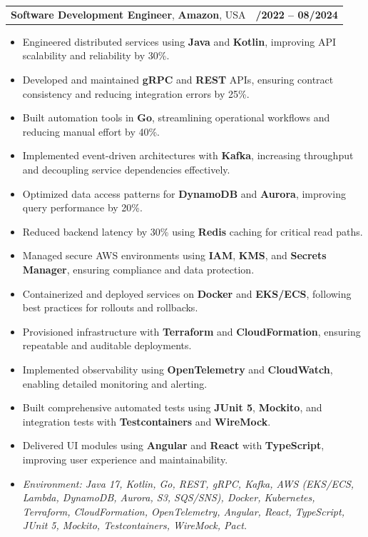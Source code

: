 \documentclass[letterpaper,11pt]{article}
\makeatletter
\newcommand{\resumeItem}[1]{
  \item\footnotesize{
    {#1 \vspace{-2pt}}
  }
}
\newcommand{\resumeSubheading}[4]{
  \vspace{-2pt}\item
    \begin{tabular*}{1.0\textwidth}[t]{l@{\extracolsep{\fill}}r}
      \textbf{\fontsize{10pt}{14pt}\selectfont #3}, \textbf{\fontsize{10pt}{14pt}\selectfont #1}, \fontsize{10pt}{14pt}\selectfont #4 & \textbf{\fontsize{10pt}{14pt}\selectfont #2} \\
    \end{tabular*}\vspace{-7pt}
}
\newcommand{\resumeItemListStart}{\begin{itemize}[leftmargin=*]}
\newcommand{\resumeItemListEnd}{\end{itemize}\vspace{-5pt}}
\makeatother
\begin{document}
\resumeSubheading
{Amazon}{10/2022 -- 08/2024}
{Software Development Engineer}{USA}
\resumeItemListStart
  \resumeItem{Engineered distributed services using \textbf{Java} and \textbf{Kotlin}, improving API scalability and reliability by 30\%.}
  \resumeItem{Developed and maintained \textbf{gRPC} and \textbf{REST} APIs, ensuring contract consistency and reducing integration errors by 25\%.}
  \resumeItem{Built automation tools in \textbf{Go}, streamlining operational workflows and reducing manual effort by 40\%.}
  \resumeItem{Implemented event-driven architectures with \textbf{Kafka}, increasing throughput and decoupling service dependencies effectively.}
  \resumeItem{Optimized data access patterns for \textbf{DynamoDB} and \textbf{Aurora}, improving query performance by 20\%.}
  \resumeItem{Reduced backend latency by 30\% using \textbf{Redis} caching for critical read paths.}
  \resumeItem{Managed secure AWS environments using \textbf{IAM}, \textbf{KMS}, and \textbf{Secrets Manager}, ensuring compliance and data protection.}
  \resumeItem{Containerized and deployed services on \textbf{Docker} and \textbf{EKS/ECS}, following best practices for rollouts and rollbacks.}
  \resumeItem{Provisioned infrastructure with \textbf{Terraform} and \textbf{CloudFormation}, ensuring repeatable and auditable deployments.}
  \resumeItem{Implemented observability using \textbf{OpenTelemetry} and \textbf{CloudWatch}, enabling detailed monitoring and alerting.}
  \resumeItem{Built comprehensive automated tests using \textbf{JUnit 5}, \textbf{Mockito}, and integration tests with \textbf{Testcontainers} and \textbf{WireMock}.}
  \resumeItem{Delivered UI modules using \textbf{Angular} and \textbf{React} with \textbf{TypeScript}, improving user experience and maintainability.}
  \resumeItem{\textit{Environment: Java 17, Kotlin, Go, REST, gRPC, Kafka, AWS (EKS/ECS, Lambda, DynamoDB, Aurora, S3, SQS/SNS), Docker, Kubernetes, Terraform, CloudFormation, OpenTelemetry, Angular, React, TypeScript, JUnit 5, Mockito, Testcontainers, WireMock, Pact.}}
\resumeItemListEnd
\end{document}
